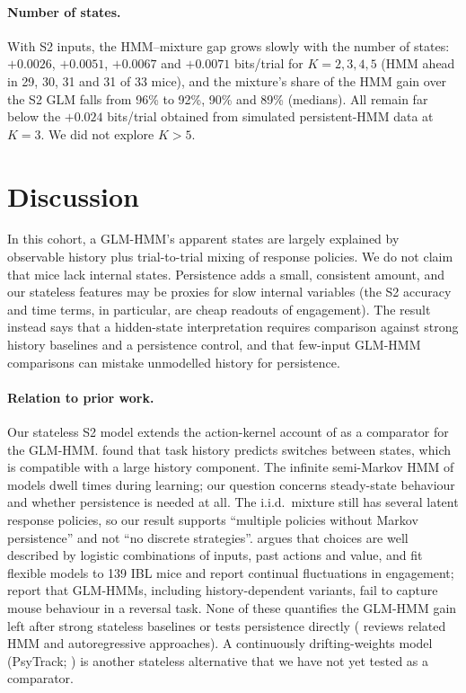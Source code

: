 \documentclass[11pt]{article}
\begin{document}
\paragraph{Number of states.} With S2 inputs, the HMM--mixture gap grows slowly with the number of states: $+0.0026$, $+0.0051$, $+0.0067$ and $+0.0071$ bits/trial for $K=2,3,4,5$ (HMM ahead in 29, 30, 31 and 31 of 33 mice), and the mixture's share of the HMM gain over the S2 GLM falls from 96\% to 92\%, 90\% and 89\% (medians). All remain far below the $+0.024$ bits/trial obtained from simulated persistent-HMM data at $K=3$. We did not explore $K>5$.

\section{Discussion}
In this cohort, a GLM-HMM's apparent states are largely explained by observable history plus trial-to-trial mixing of response policies. We do not claim that mice lack internal states. Persistence adds a small, consistent amount, and our stateless features may be proxies for slow internal variables (the S2 accuracy and time terms, in particular, are cheap readouts of engagement). The result instead says that a hidden-state interpretation requires comparison against strong history baselines and a persistence control, and that few-input GLM-HMM comparisons can mistake unmodelled history for persistence.

\paragraph{Relation to prior work.} Our stateless S2 model extends the action-kernel account of \citet{findling2025} as a comparator for the GLM-HMM. \citet{mohammadi2025} found that task history predicts switches between states, which is compatible with a large history component. The infinite semi-Markov HMM of \citet{bruijns2025} models dwell times during learning; our question concerns steady-state behaviour and whether persistence is needed at all. The i.i.d.\ mixture still has several latent response policies, so our result supports ``multiple policies without Markov persistence'' and not ``no discrete strategies''. \citet{carandini2024} argues that choices are well described by logistic combinations of inputs, past actions and value, and \citet{bruijns2025b} fit flexible models to 139 IBL mice and report continual fluctuations in engagement; \citet{nicoletti2026} report that GLM-HMMs, including history-dependent variants, fail to capture mouse behaviour in a reversal task. None of these quantifies the GLM-HMM gain left after strong stateless baselines or tests persistence directly (\citealt{urai2025} reviews related HMM and autoregressive approaches). A continuously drifting-weights model (PsyTrack; \citealt{roy2021}) is another stateless alternative that we have not yet tested as a comparator.
\end{document}
